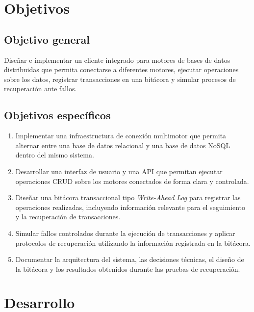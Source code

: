 \documentclass[12pt,letterpaper]{article}
\begin{document}
\section{Objetivos}

\subsection{Objetivo general}

Diseñar e implementar un cliente integrado para motores de bases de datos distribuidas que
permita conectarse a diferentes motores, ejecutar operaciones sobre los datos, registrar
transacciones en una bitácora y simular procesos de recuperación ante fallos.

\subsection{Objetivos específicos}

\begin{enumerate}[leftmargin=2em]
  \item Implementar una infraestructura de conexión multimotor que permita alternar entre una
        base de datos relacional y una base de datos NoSQL dentro del mismo sistema.
  \item Desarrollar una interfaz de usuario y una API que permitan ejecutar operaciones CRUD
        sobre los motores conectados de forma clara y controlada.
  \item Diseñar una bitácora transaccional tipo \textit{Write-Ahead Log} para registrar las
        operaciones realizadas, incluyendo información relevante para el seguimiento y la
        recuperación de transacciones.
  \item Simular fallos controlados durante la ejecución de transacciones y aplicar protocolos de
        recuperación utilizando la información registrada en la bitácora.
  \item Documentar la arquitectura del sistema, las decisiones técnicas, el diseño de la bitácora
        y los resultados obtenidos durante las pruebas de recuperación.
\end{enumerate}

\section{Desarrollo}
\end{document}
